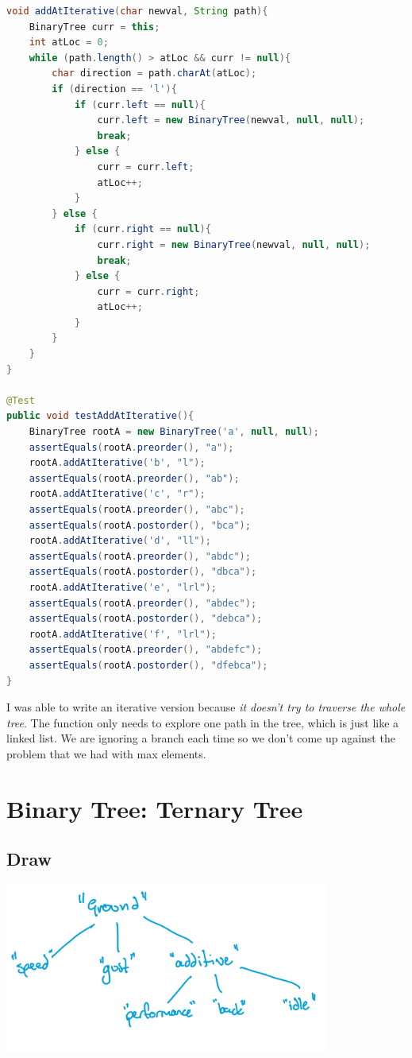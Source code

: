 \documentclass[twoside=false,DIV=14]{scrartcl}
\begin{document}
\begin{lstlisting}[language=java]
void addAtIterative(char newval, String path){
    BinaryTree curr = this;
    int atLoc = 0;
    while (path.length() > atLoc && curr != null){
        char direction = path.charAt(atLoc);
        if (direction == 'l'){
            if (curr.left == null){
                curr.left = new BinaryTree(newval, null, null);
                break;
            } else {
                curr = curr.left;
                atLoc++;
            }
        } else {
            if (curr.right == null){
                curr.right = new BinaryTree(newval, null, null);
                break;
            } else {
                curr = curr.right;
                atLoc++;
            }
        }
    }
}

@Test
public void testAddAtIterative(){
    BinaryTree rootA = new BinaryTree('a', null, null);
    assertEquals(rootA.preorder(), "a");
    rootA.addAtIterative('b', "l");
    assertEquals(rootA.preorder(), "ab");
    rootA.addAtIterative('c', "r");
    assertEquals(rootA.preorder(), "abc");
    assertEquals(rootA.postorder(), "bca");
    rootA.addAtIterative('d', "ll");
    assertEquals(rootA.preorder(), "abdc");
    assertEquals(rootA.postorder(), "dbca");
    rootA.addAtIterative('e', "lrl");
    assertEquals(rootA.preorder(), "abdec");
    assertEquals(rootA.postorder(), "debca");
    rootA.addAtIterative('f', "lrl");
    assertEquals(rootA.preorder(), "abdefc");
    assertEquals(rootA.postorder(), "dfebca");
}

\end{lstlisting}
I was able to write an iterative version because \emph{it doesn't try to traverse the whole tree}.  The function only needs to explore one path in the tree, which is just like a linked list.  We are ignoring a branch each time so we don't come up against the problem that we had with max elements.

\section{Binary Tree: Ternary Tree}
\subsection{Draw}
\includegraphics[width=0.8\textwidth]{ternary_tree.jpeg}
\end{document}
